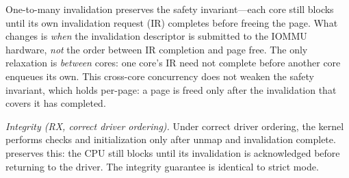 




One-to-many invalidation preserves the safety invariant---each core still blocks until 
    its own invalidation request (IR) completes before freeing the page.
What changes is \emph{when} the invalidation descriptor is submitted to the IOMMU hardware, 
    {\it not} the order between IR completion and page free.
The only relaxation is \emph{between} cores: one core's IR need not complete before another core enqueues its own.
This cross-core concurrency does not weaken the safety invariant, 
    which holds per-page: a page is freed only after the invalidation that covers it has completed.

\emph{Integrity (RX, correct driver ordering).}
Under correct driver ordering, the kernel performs checks and initialization only after unmap and invalidation complete.
\optOne preserves this: the CPU still blocks until its invalidation is acknowledged before returning to the driver.
The integrity guarantee is identical to strict mode.

